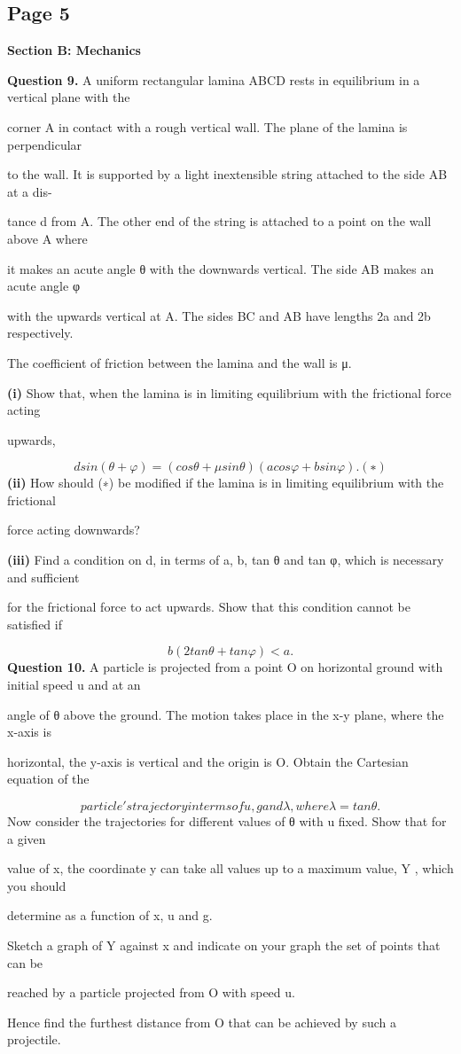\documentclass[12pt]{article}
\begin{document}
\subsection*{Page 5}
\begin{flushleft}
\bigskip\textbf{Section B: Mechanics}\par
\bigskip\textbf{Question 9.} A uniform rectangular lamina ABCD rests in equilibrium in a vertical plane with the\par
corner A in contact with a rough vertical wall. The plane of the lamina is perpendicular\par
to the wall. It is supported by a light inextensible string attached to the side AB at a dis-\par
tance d from A. The other end of the string is attached to a point on the wall above A where\par
it makes an acute angle θ with the downwards vertical. The side AB makes an acute angle φ\par
with the upwards vertical at A. The sides BC and AB have lengths 2a and 2b respectively.\par
The coefficient of friction between the lamina and the wall is μ.\par
\textbf{(i)} Show that, when the lamina is in limiting equilibrium with the frictional force acting\par
upwards,\par
\[d sin(θ + φ) = (cos θ + μ sin θ)(a cos φ + b sin φ) . (∗)\]
\textbf{(ii)} How should (∗) be modified if the lamina is in limiting equilibrium with the frictional\par
force acting downwards?\par
\textbf{(iii)} Find a condition on d, in terms of a, b, tan θ and tan φ, which is necessary and sufficient\par
for the frictional force to act upwards. Show that this condition cannot be satisfied if\par
\[b(2 tan θ + tan φ) < a.\]
\bigskip\textbf{Question 10.} A particle is projected from a point O on horizontal ground with initial speed u and at an\par
angle of θ above the ground. The motion takes place in the x-y plane, where the x-axis is\par
horizontal, the y-axis is vertical and the origin is O. Obtain the Cartesian equation of the\par
\[particle's trajectory in terms of u, g and λ, where λ = tan θ.\]
Now consider the trajectories for different values of θ with u fixed. Show that for a given\par
value of x, the coordinate y can take all values up to a maximum value, Y , which you should\par
determine as a function of x, u and g.\par
Sketch a graph of Y against x and indicate on your graph the set of points that can be\par
reached by a particle projected from O with speed u.\par
Hence find the furthest distance from O that can be achieved by such a projectile.\par
\end{flushleft}
\end{document}

